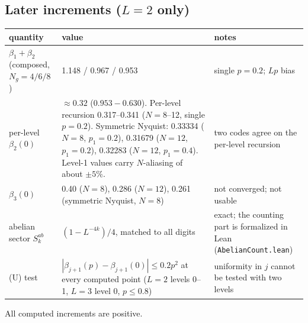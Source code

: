 \subsection{Later increments ($L=2$ only)}\label{sec:later}
\begin{longtable}{|p{3.4cm}|p{7.2cm}|p{4.4cm}|}
\hline
quantity & value & notes \\ \hline
$\beta_1+\beta_2$ (composed, $N_g=4/6/8$) & 1.148 / 0.967 / 0.953 & single $p=0.2$; $Lp$ bias \\ \hline
per-level $\beta_2(0)$ & $\approx0.32$ ($0.953-0.630$). Per-level recursion 0.317--0.341 ($N=8$--12, single $p=0.2$). Symmetric Nyquist: 0.33334 ($N=8$, $p_1=0.2$), 0.31679 ($N=12$, $p_1=0.2$), 0.32283 ($N=12$, $p_1=0.4$). Level-1 values carry $N$-aliasing of about $\pm5\%$. & two codes agree on the per-level recursion \\ \hline
$\beta_3(0)$ & 0.40 ($N=8$), 0.286 ($N=12$), 0.261 (symmetric Nyquist, $N=8$) & not converged; not usable \\ \hline
abelian sector $S_k^{ab}$ & $(1-L^{-4k})/4$, matched to all digits & exact; the counting part is formalized in Lean (\texttt{AbelianCount.lean}) \\ \hline
(U) test & $|\beta_{j+1}(p)-\beta_{j+1}(0)|\le0.2p^2$ at every computed point ($L=2$ levels 0--1, $L=3$ level 0, $p\le0.8$) & uniformity in $j$ cannot be tested with two levels \\ \hline
\end{longtable}
All computed increments are positive.

